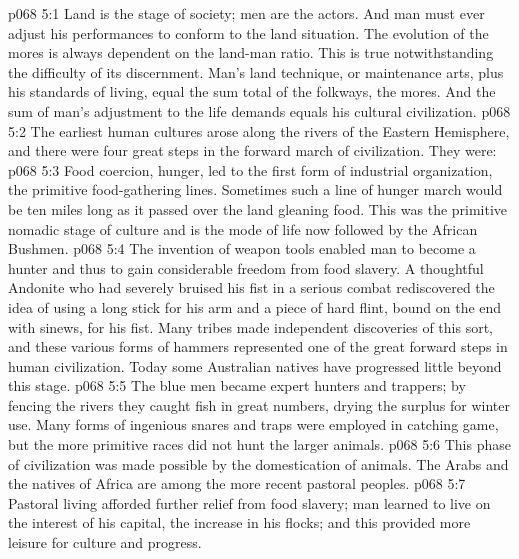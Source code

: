 \vs p068 5:1 Land is the stage of society; men are the actors. And man must ever adjust his performances to conform to the land situation. The evolution of the mores is always dependent on the land\hyp{}man ratio. This is true notwithstanding the difficulty of its discernment. Man’s land technique, or maintenance arts, plus his standards of living, equal the sum total of the folkways, the mores. And the sum of man’s adjustment to the life demands equals his cultural civilization.
\vs p068 5:2 The earliest human cultures arose along the rivers of the Eastern Hemisphere, and there were four great steps in the forward march of civilization. They were:
\vs p068 5:3 \bibnobreakspace {} Food coercion, hunger, led to the first form of industrial organization, the primitive food\hyp{}gathering lines. Sometimes such a line of hunger march would be ten miles long as it passed over the land gleaning food. This was the primitive nomadic stage of culture and is the mode of life now followed by the African Bushmen.
\vs p068 5:4 \pc {}\bibnobreakspace {} The invention of weapon tools enabled man to become a hunter and thus to gain considerable freedom from food slavery. A thoughtful Andonite who had severely bruised his fist in a serious combat rediscovered the idea of using a long stick for his arm and a piece of hard flint, bound on the end with sinews, for his fist. Many tribes made independent discoveries of this sort, and these various forms of hammers represented one of the great forward steps in human civilization. Today some Australian natives have progressed little beyond this stage.
\vs p068 5:5 The blue men became expert hunters and trappers; by fencing the rivers they caught fish in great numbers, drying the surplus for winter use. Many forms of ingenious snares and traps were employed in catching game, but the more primitive races did not hunt the larger animals.
\vs p068 5:6 \pc {}\bibnobreakspace {} This phase of civilization was made possible by the domestication of animals. The Arabs and the natives of Africa are among the more recent pastoral peoples.
\vs p068 5:7 Pastoral living afforded further relief from food slavery; man learned to live on the interest of his capital, the increase in his flocks; and this provided more leisure for culture and progress.
